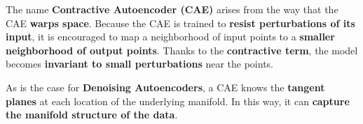 The name \textbf{Contractive Autoencoder (CAE)} arises from the way that the CAE \textbf{warps space}. 
Because the CAE is trained to \textbf{resist perturbations of its input}, it is encouraged to map a neighborhood of input points to a \textbf{smaller neighborhood of output points}. 
Thanks to the \textbf{contractive term}, the model becomes \textbf{invariant to small perturbations} near the points.

As is the case for \textbf{Denoising Autoencoders}, a CAE knows the \textbf{tangent planes} at each location of the underlying manifold. 
In this way, it can \textbf{capture the manifold structure of the data}.
